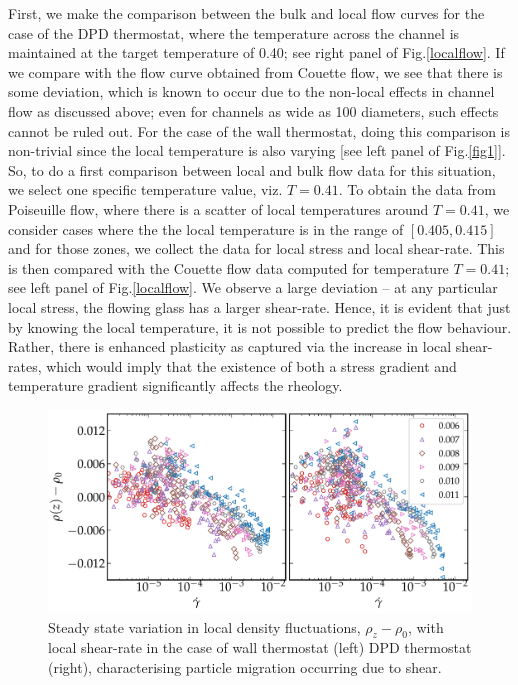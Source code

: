 First, we make the comparison between the bulk and local flow curves for the case of the DPD thermostat, where the temperature across the channel is maintained at the target temperature of 0.40; see right panel of Fig.\ref{localflow}. If we compare with the flow curve obtained from Couette flow, we see that there is some deviation, which is known to occur due to the non-local effects in channel flow as discussed above; even for channels as wide as 100 diameters, such effects cannot be ruled out. For the case of the wall thermostat, doing this comparison is non-trivial since the local temperature is also varying [see left panel of Fig.\ref{fig1}]. So, to do a first comparison between local and bulk flow data for this situation, we select one specific temperature value, viz. $T=0.41$. To obtain the data from Poiseuille flow, where there is a scatter of local temperatures around $T=0.41$, we consider cases where the the  local temperature is in the range of $[0.405,0.415]$ and for those zones, we collect the data for local stress and local shear-rate.  This is then compared with the Couette flow data computed for temperature $T=0.41$; see left panel of Fig.\ref{localflow}. We observe a large deviation -- at any particular local stress, the flowing glass has a larger shear-rate. Hence, it is evident that just by knowing the local temperature, it is not possible to predict the flow behaviour. Rather, there is enhanced plasticity as captured via the increase in local shear-rates, which would imply that the existence of both a stress gradient and temperature gradient significantly affects the rheology.

\begin{figure}[t]
\centering
\includegraphics[width=15cm]{figs/denShrRt.pdf}
\caption[{\em Steady state variation in local density fluctuations with local shear-rate for wall thermostat and DPD thermostat}]{Steady state variation in local density fluctuations, $\rho_z-\rho_0$, with local shear-rate in the case of wall thermostat (left) DPD thermostat (right), characterising particle migration occurring due to shear.}
\label{migration}
\end{figure}

